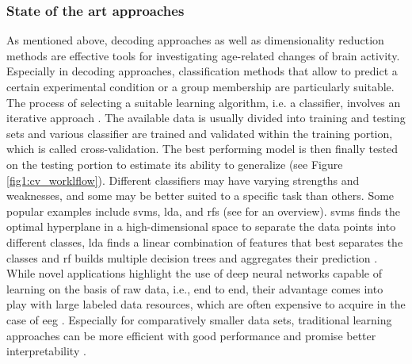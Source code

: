 \subsubsection{State of the art approaches}
As mentioned above, decoding approaches as well as dimensionality reduction methods are effective tools for investigating age-related changes of brain activity. Especially in decoding approaches, classification methods that allow to predict a certain experimental condition or a group membership are particularly suitable. The process of selecting a suitable learning algorithm, i.e. a classifier, involves an iterative approach \cite{Hastie2009}. The available data is usually divided into training and testing sets and various classifier are trained and validated within the training portion, which is called cross-validation. The best performing model is then finally tested on the testing portion to estimate its ability to generalize (see Figure \ref{fig1:cv_worklflow}). Different classifiers may have varying strengths and weaknesses, and some may be better suited to a specific task than others. Some popular examples include \glspl{svm}, \gls{lda}, and \glspl{rf} (see \cite{shoorangiz2021eeg} for an overview). \Glspl{svm} finds the optimal hyperplane in a high-dimensional space to separate the data points into different classes, \gls{lda} finds a linear combination of features that best separates the classes and \gls{rf} builds multiple decision trees and aggregates their prediction \cite{shoorangiz2021eeg}.\\
While novel applications highlight the use of deep neural networks capable of learning on the basis of raw data, i.e., end to end, their advantage comes into play with large labeled data resources, which are often expensive to acquire in the case of \gls{eeg} \cite{Banville2021}. Especially for comparatively smaller data sets, traditional learning approaches can be more efficient with good performance and promise better interpretability \cite{Gemein2020}.


\begin{figure*}[h]
  \caption{State of the art approaches}
  \label{fig1:cv_worklflow}
\end{figure*}


